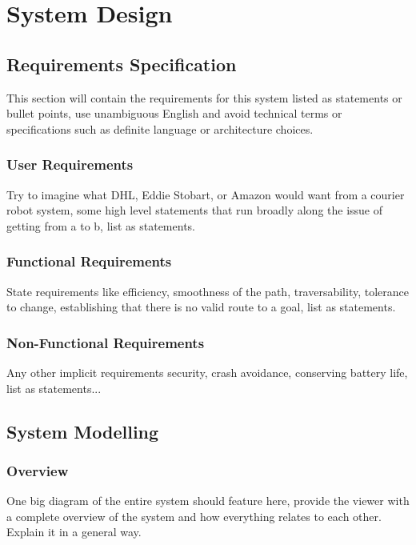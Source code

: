\chapter{System Design}


\section{Requirements Specification}
This section will contain the requirements for this system listed as statements or bullet points, use unambiguous English and avoid technical terms or specifications such as definite language or architecture choices.

\subsection{User Requirements}
Try to imagine what DHL, Eddie Stobart, or Amazon would want from a courier robot system, some high level statements that run broadly along the issue of getting from a to b, list as statements.

\subsection{Functional Requirements}
State requirements like efficiency, smoothness of the path, traversability, tolerance to change, establishing that there is no valid route to a goal, list as statements.

\subsection{Non-Functional Requirements}
Any other implicit requirements security, crash avoidance, conserving battery life, list as statements...

\newpage


\section{System Modelling}

\subsection{Overview}
One big diagram of the entire system should feature here, provide the viewer with a complete overview of the system and how everything relates to each other. Explain it in a general way.

